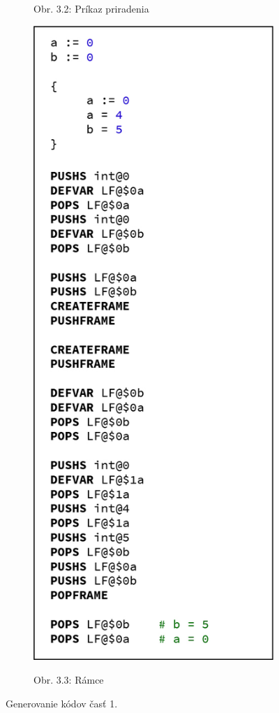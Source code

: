 \documentclass[a4paper,11pt]{article}
\begin{document}
\begin{figure}[h!]
\begin{subfigure}[h]{0.4\textwidth}
					\caption*{Obr. 3.2: Príkaz priradenia}
					\label{fig:prir}
				\end{subfigure}\qquad
				\begin{subfigure}[h]{0.4\textwidth}
					\includegraphics[width=\textwidth]{codes/ramce.jpg}\\
					\caption*{Obr. 3.3: Rámce}
					\label{fig:ramce}
				\end{subfigure}
				\caption{Generovanie kódov časť 1.}
				\label{fig:3}
			\end{figure}
\end{document}

